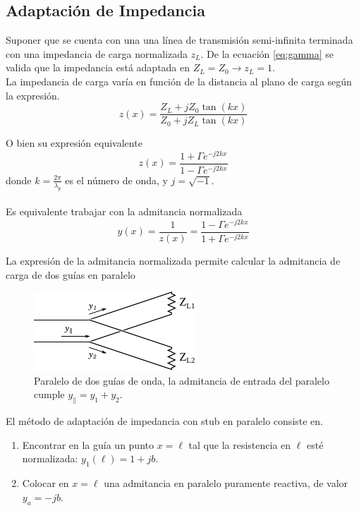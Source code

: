 \documentclass[11pt,a4paper]{article}
\begin{document}
\begin{multicols}{2}
\subsection{Adaptación de Impedancia}

Suponer que se cuenta con una una línea de transmisión semi-infinita terminada con una impedancia de carga normalizada $z_L$.
De la ecuación \ref{eq:gamma} se valida que la impedancia está adaptada en $Z_L = Z_0 \longrightarrow z_L = 1$.\\

La impedancia de carga varía en función de la distancia al plano de carga según la expresión.\\

\begin{equation*}
    z(x) = \frac{Z_L + j Z_0\tan(kx)}{Z_0 + j Z_L\tan(kx)}
\end{equation*}

O bien su expresión equivalente
\begin{equation*}
    z(x) = \frac{1 + \Gamma e^{-j2kx}}{1 - \Gamma e^{-j2kx}}
\end{equation*}
donde $k=\frac{2\pi}{\lambda_g}$ es el número de onda, y $j=\sqrt{-1}$. \\ \\Es equivalente trabajar con la admitancia normalizada
\begin{equation*}
    y(x) = \frac{1}{z(x)} = \frac{1 - \Gamma e^{-j2kx}}{1 + \Gamma e^{-j2kx}}
\end{equation*}

La expresión de la admitancia normalizada permite calcular la admitancia de carga de dos guías en paralelo
\begin{figure}[H]
    \centering
    \includegraphics[width=0.7\linewidth]{Images/guiapll.pdf}
    \caption{Paralelo de dos guías de onda, la admitancia de entrada del paralelo cumple $y_\parallel = y_1+y_2$.}
    \label{fig:pll}
\end{figure}

El método de adaptación de impedancia con stub en paralelo consiste en. 
\begin{enumerate}
    \item Encontrar en la guía un punto $x = \ell$ tal que la resistencia en $\ell$ esté normalizada: $y_1(\ell)=1+jb$.
    \item Colocar en $x=\ell$ una admitancia en paralelo puramente reactiva, de valor $y_a = -jb$.
\end{enumerate}


\end{multicols}
\end{document}
